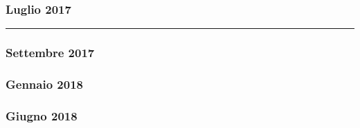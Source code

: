 \begin{mdframed}
	

	\myrule

	
\end{mdframed}


\subsubsection*{Luglio 2017}

\begin{mdframed}
	

	\noindent\hfil\rule{\textwidth}{.4pt}\hfil

	
\end{mdframed}


\subsubsection*{Settembre 2017}

\begin{mdframed}
	
\end{mdframed}


\newpage

\subsubsection*{Gennaio 2018}

\begin{mdframed}
	\begin{mdframed}
		
	\end{mdframed}

	
\end{mdframed}


\subsubsection*{Giugno 2018}

